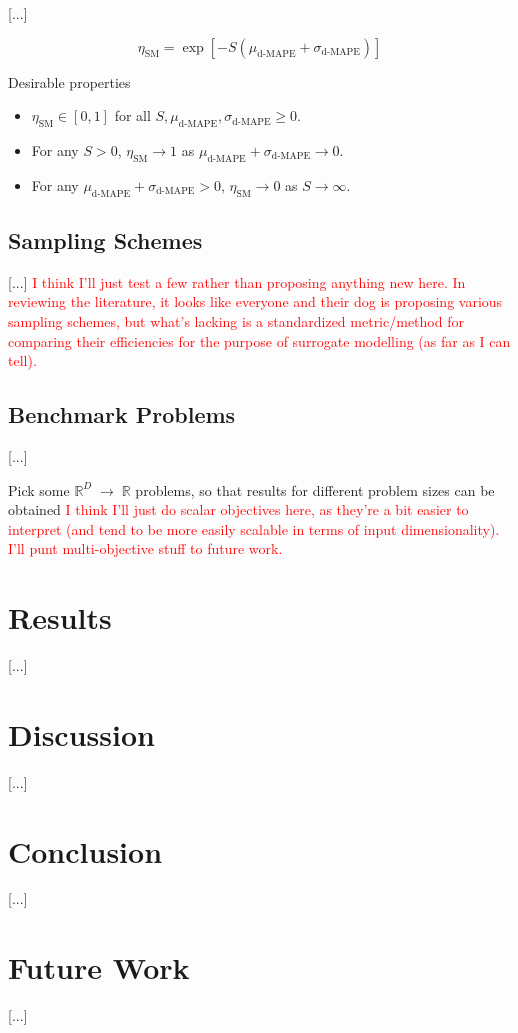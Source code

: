 \documentclass[conference]{IEEEtran}
\begin{document}
[...]

\begin{equation}
	\eta_\textrm{SM} = \exp\left[-S(\mu_\textrm{d-MAPE} + \sigma_\textrm{d-MAPE})\right]
	\label{eqn:efficiency_proposition}
\end{equation}

\noindent Desirable properties

\begin{itemize}
	\item $\eta_\textrm{SM}\in[0,1]$ for all $S,\mu_\textrm{d-MAPE},\sigma_\textrm{d-MAPE}\geq 0$.
	\item For any $S>0$, $\eta_\textrm{SM}\to 1$ as $\mu_\textrm{d-MAPE} + \sigma_\textrm{d-MAPE}\to 0$.
	\item For any $\mu_\textrm{d-MAPE} + \sigma_\textrm{d-MAPE}>0$, $\eta_\textrm{SM}\to 0$ as $S\to\infty$.
\end{itemize}

\subsection{Sampling Schemes}

[...] \textcolor{red}{I think I'll just test a few rather than proposing anything new here. In reviewing the literature, it looks like everyone and their dog is proposing various sampling schemes, but what's lacking is a standardized metric/method for comparing their efficiencies for the purpose of surrogate modelling (as far as I can tell).}

\subsection{Benchmark Problems}

[...]

Pick some $\mathbb{R}^D\;\to\;\mathbb{R}$ problems, so that results for different problem sizes can be obtained \textcolor{red}{I think I'll just do scalar objectives here, as they're a bit easier to interpret (and tend to be more easily scalable in terms of input dimensionality). I'll punt multi-objective stuff to future work.}

\section{Results}

[...]

\section{Discussion}

[...]

\section{Conclusion}

[...]

\section{Future Work}

[...]



{}

\end{document}
